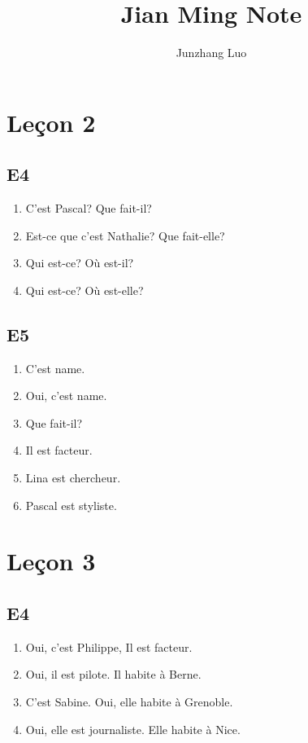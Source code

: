 \documentclass{book}
\title{Jian Ming Note}
\author{Junzhang Luo}
\begin{document}
\tableofcontents

\chapter{Leçon 2}
    
    \section{E4}
        \begin{enumerate}
            \item C'est Pascal? Que fait-il?
            \item Est-ce que c'est Nathalie? Que fait-elle?
            \item Qui est-ce? Où est-il?
            \item Qui est-ce? Où est-elle?
        \end{enumerate}

    \section{E5}
        \begin{enumerate}
            \item C'est name.
            \item Oui, c'est name.
            \item Que fait-il?
            \item Il est facteur.
            \item Lina est chercheur.
            \item Pascal est styliste.
        \end{enumerate}

\chapter{Leçon 3}
    \section{E4}
        \begin{enumerate}
            \item Oui, c'est Philippe, Il est facteur.
            \item Oui, il est pilote. Il habite à Berne.
            \item C'est Sabine. Oui, elle habite à Grenoble.
            \item Oui, elle est journaliste. Elle habite à Nice.
        \end{enumerate}
\end{document}
